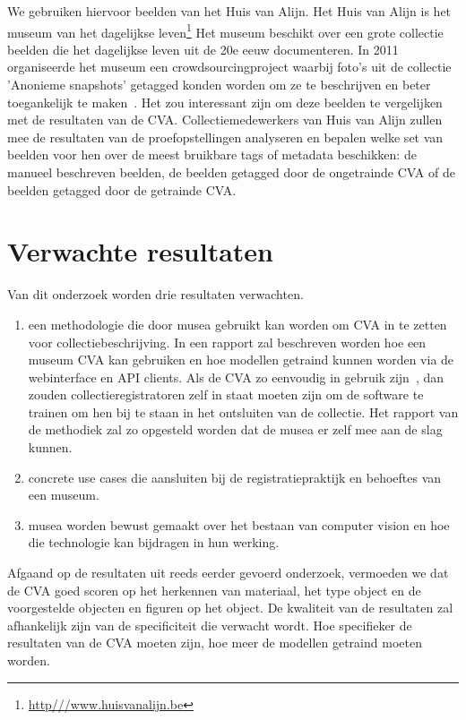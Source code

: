 We gebruiken hiervoor beelden van het Huis van Alijn. Het Huis van Alijn is het museum van het dagelijkse leven\footnote{\url{http///www.huisvanalijn.be}} Het museum beschikt over een grote collectie beelden die het dagelijkse leven uit de 20e eeuw documenteren. In 2011 organiseerde het museum een crowdsourcingproject waarbij foto's uit de collectie 'Anonieme snapshots' getagged konden worden om ze te beschrijven en beter toegankelijk te maken~\autocite{Wiericx2011}. Het zou interessant zijn om deze beelden te vergelijken met de resultaten van de CVA. Collectiemedewerkers van Huis van Alijn zullen mee de resultaten van de proefopstellingen analyseren en bepalen welke set van beelden voor hen over de meest bruikbare tags of metadata beschikken: de manueel beschreven beelden, de beelden getagged door de ongetrainde CVA of de beelden getagged door de getrainde CVA.
\section{Verwachte resultaten}

Van dit onderzoek worden drie resultaten verwachten.

\begin{enumerate}
\item een methodologie die door musea gebruikt kan worden om CVA in te zetten voor collectiebeschrijving. In een rapport zal beschreven worden hoe een museum CVA kan gebruiken en hoe modellen getraind kunnen worden via de webinterface en API clients. Als de CVA zo eenvoudig in gebruik zijn~\autocite{Lardinois2018}, dan zouden collectieregistratoren zelf in staat moeten zijn om de software te trainen om hen bij te staan in het ontsluiten van de collectie. Het rapport van de methodiek zal zo opgesteld worden dat de musea er zelf mee aan de slag kunnen.
\item concrete use cases die aansluiten bij de registratiepraktijk en behoeftes van een museum.
\item musea worden bewust gemaakt over het bestaan van computer vision en hoe die technologie kan bijdragen in hun werking.
\end{enumerate}

Afgaand op de resultaten uit reeds eerder gevoerd onderzoek, vermoeden we dat de CVA goed scoren op het herkennen van materiaal, het type object en de voorgestelde objecten en figuren op het object. De kwaliteit van de resultaten zal afhankelijk zijn van de specificiteit die verwacht wordt. Hoe specifieker de resultaten van de CVA moeten zijn, hoe meer de modellen getraind moeten worden.
